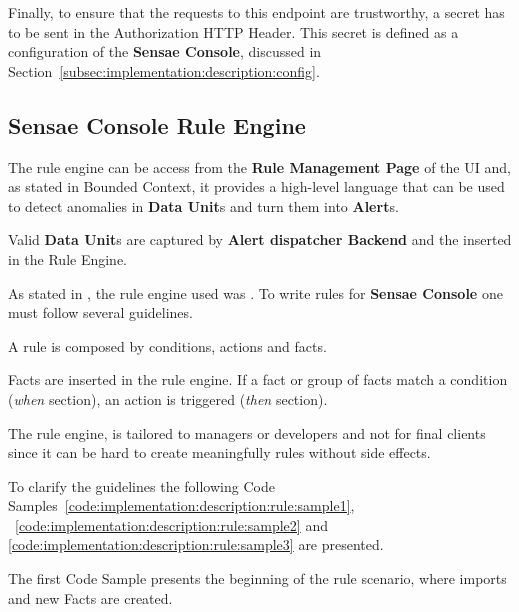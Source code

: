 Finally, to ensure that the requests to this endpoint are trustworthy, a secret has to be sent in the Authorization HTTP Header. This secret is defined as a configuration of the \textbf{Sensae Console}, discussed in Section~\ref{subsec:implementation:description:config}.

\subsection{Sensae Console Rule Engine}
\label{subsec:implementation:description:rule}

The rule engine can be access from the \textbf{Rule Management Page} of the UI and, as stated in  Bounded Context, it provides a high-level language that can be used to detect anomalies in \textbf{Data Unit}s and turn them into \textbf{Alert}s.

Valid \textbf{Data Unit}s are captured by \textbf{Alert dispatcher Backend} and the inserted in the Rule Engine.

As stated in , the rule engine used was . To write rules for \textbf{Sensae Console} one must follow several guidelines.

A  rule is composed by conditions, actions and facts.

Facts are inserted in the rule engine. If a fact or group of facts match a condition (\textit{when} section), an action is triggered (\textit{then} section).

The rule engine, is tailored to managers or developers and not for final clients since it can be hard to create meaningfully rules without side effects.

To clarify the guidelines the following Code Samples~\ref{code:implementation:description:rule:sample1}, ~\ref{code:implementation:description:rule:sample2} and \ref{code:implementation:description:rule:sample3} are presented.

The first Code Sample presents the beginning of the rule scenario, where imports and new Facts are created.

